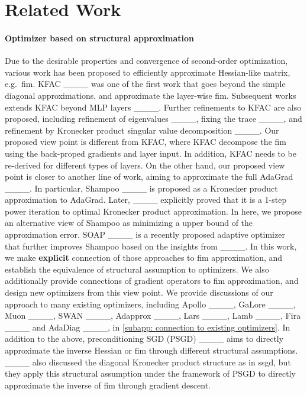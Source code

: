 \section{Related Work}
\label{sec: related work}
\paragraph{Optimizer based on structural approximation}
Due to the desirable properties and convergence of second-order optimization, various work has been proposed to efficiently approximate Hessian-like matrix, e.g.~\gls{fim}. KFAC ____ was one of the first work that goes beyond the simple diagonal approximations, and approximate the layer-wise \gls{fim}. Subsequent works extends KFAC beyond MLP layers ____. Further refinements to KFAC are also proposed, including refinement of eigenvalues ____, fixing the trace ____, and refinement by Kronecker product singular value decomposition ____. Our proposed view point is different from KFAC, where KFAC decompose the \gls{fim} using the back-proped gradients and layer input. In addition, KFAC needs to be re-derived for different types of layers. On the other hand, our proposed view point is closer to another line of work, aiming to approximate the full AdaGrad ____. In particular, Shampoo ____ is proposed as a Kronecker product approximation to AdaGrad. Later, ____ explicitly proved that it is a 1-step power iteration to optimal Kronecker product approximation. 
In here, we propose an alternative view of Shampoo as minimizing a upper bound of the approximation error. SOAP ____ is a recently proposed adaptive optimizer that further improves Shampoo based on the insights from ____. 
In this work, we make \textbf{explicit} connection of those approaches to \gls{fim} approximation, and establish the equivalence of structural assumption to optimizers. We also additionally provide connections of gradient operators to \gls{fim} approximation, and design new optimizers from this view point. We provide discussions of our approach to many existing optimizers, including Apollo ____, GaLore ____, Muon ____, SWAN ____, Adapprox ____, Lars ____, Lamb ____, Fira ____ and AdaDiag ____, in \cref{subapp: connection to existing optimizers}. 
In addition to the above, preconditioning SGD (PSGD) ____ aims to directly approximate the inverse Hessian or \gls{fim} through different structural assumptions. ____ also discussed the diagonal Kronecker product structure as in \gls{ssgd}, but they apply this structural assumption under the framework of PSGD to directly approximate the inverse of \gls{fim} through gradient descent.  

